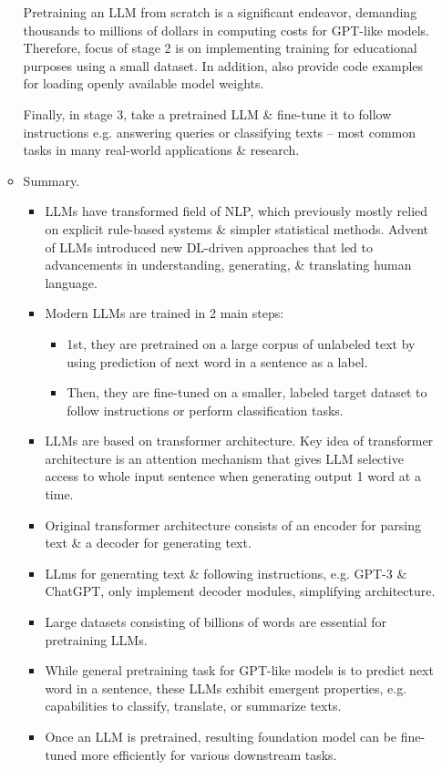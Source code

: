 \documentclass{article}
\begin{document}
\begin{itemize}
\begin{itemize}
		Pretraining an LLM from scratch is a significant endeavor, demanding thousands to millions of dollars in computing costs for GPT-like models. Therefore, focus of stage 2 is on implementing training for educational purposes using a small dataset. In addition, also provide code examples for loading openly available model weights.
		
		Finally, in stage 3, take a pretrained LLM \& fine-tune it to follow instructions e.g. answering queries or classifying texts -- most common tasks in many real-world applications \& research.
		\item {\sf Summary.}
		\begin{itemize}
			\item LLMs have transformed field of NLP, which previously mostly relied on explicit rule-based systems \& simpler statistical methods. Advent of LLMs introduced new DL-driven approaches that led to advancements in understanding, generating, \& translating human language.
			\item Modern LLMs are trained in 2 main steps:
			\begin{itemize}
				\item 1st, they are pretrained on a large corpus of unlabeled text by using prediction of next word in a sentence as a label.
				\item Then, they are fine-tuned on a smaller, labeled target dataset to follow instructions or perform classification tasks.
			\end{itemize}
			\item LLMs are based on transformer architecture. Key idea of transformer architecture is an attention mechanism that gives LLM selective access to whole input sentence when generating output 1 word at a time.
			\item Original transformer architecture consists of an encoder for parsing text \& a decoder for generating text.
			\item LLms for generating text \& following instructions, e.g. GPT-3 \& ChatGPT, only implement decoder modules, simplifying architecture.
			\item Large datasets consisting of billions of words are essential for pretraining LLMs.
			\item While general pretraining task for GPT-like models is to predict next word in a sentence, these LLMs exhibit emergent properties, e.g. capabilities to classify, translate, or summarize texts.
			\item Once an LLM is pretrained, resulting foundation model can be fine-tuned more efficiently for various downstream tasks.

\end{itemize}
\end{itemize}
\end{itemize}
\end{document}
